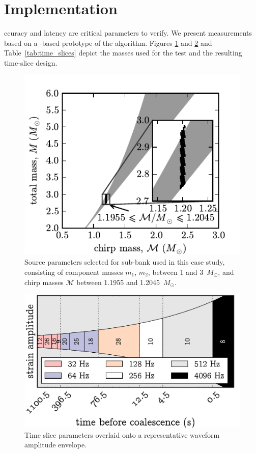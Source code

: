 \documentclass[portrait,plainboxedsections]{sciposter}
\begin{document}
\begin{minipage}[t]{0.25\textwidth}

\section*{Implementation}

ccuracy and latency are critical parameters to verify. We present
measurements based on a \gstreamer{}-based prototype of the \lloid{}
algorithm. Figures \ref{fig:tmpltbank} and \ref{fig:time_slices} and
Table~\ref{tab:time_slices} depict the masses used for the test and the
resulting time-slice design.

\begin{figure}[h]
	\includegraphics[width=\textwidth]{figures/tmpltbank}
	\caption{\label{fig:tmpltbank}Source parameters selected for sub-bank used in this
case study, consisting of component masses $m_1$, $m_2$, between 1 and 3~$M_\odot$, and
chirp masses $\mathcal{M}$ between 1.1955 and 1.2045~$M_\odot$.}
\end{figure}

\begin{figure}
\includegraphics[width=\textwidth]{figures/envelope}
\caption{\label{fig:time_slices} Time slice parameters overlaid onto a representative waveform amplitude envelope.}
\end{figure}


\end{minipage}
\end{document}
